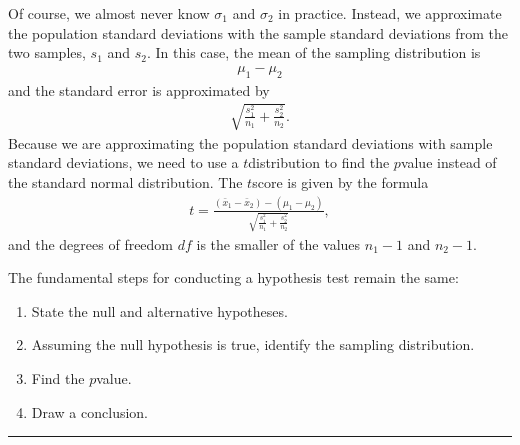 \documentclass[letterpaper,10pt,english]{jupyterBook}
\begin{document}
\sphinxAtStartPar
Of course, we almost never know \(\sigma_1\) and \(\sigma_2\) in practice. Instead, we approximate the population standard deviations with the sample standard deviations from the two samples, \(s_1\) and \(s_2\). In this case, the mean of the sampling distribution is
\begin{equation*}
\begin{split} \mu_1 - \mu_2 \end{split}
\end{equation*}
\sphinxAtStartPar
and the standard error is approximated by
\begin{equation*}
\begin{split} \sqrt{\frac{s_1^2}{n_1} + \frac{s_2^2}{n_2}}. \end{split}
\end{equation*}
\sphinxAtStartPar
Because we are approximating the population standard deviations with sample standard deviations, we need to use a \(t\)\sphinxhyphen{}distribution to find the \(p\)\sphinxhyphen{}value instead of the standard normal distribution. The \(t\)\sphinxhyphen{}score is given by the formula
\begin{equation*}
\begin{split} t = \frac{(\bar{x}_1 - \bar{x}_2) - (\mu_1 - \mu_2)}{\sqrt{\frac{s_1^2}{n_1} + \frac{s_2^2}{n_2}}}, \end{split}
\end{equation*}
\sphinxAtStartPar
and the degrees of freedom \(df\) is the smaller of the values \(n_1 - 1\) and \(n_2 - 1\).

\sphinxAtStartPar
The fundamental steps for conducting a hypothesis test remain the same:
\begin{enumerate}
%
\item {} 
\sphinxAtStartPar
State the null and alternative hypotheses.

\item {} 
\sphinxAtStartPar
Assuming the null hypothesis is true, identify the sampling distribution.

\item {} 
\sphinxAtStartPar
Find the \(p\)\sphinxhyphen{}value.

\item {} 
\sphinxAtStartPar
Draw a conclusion.

\end{enumerate}


\bigskip\hrule\bigskip
\end{document}
